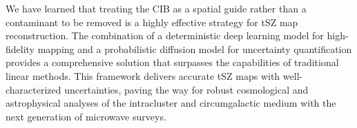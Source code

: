 \documentclass[]{article}
\begin{document}
We have learned that treating the CIB as a spatial guide rather than a contaminant to be removed is a highly effective strategy for tSZ map reconstruction. The combination of a deterministic deep learning model for high-fidelity mapping and a probabilistic diffusion model for uncertainty quantification provides a comprehensive solution that surpasses the capabilities of traditional linear methods. This framework delivers accurate tSZ maps with well-characterized uncertainties, paving the way for robust cosmological and astrophysical analyses of the intracluster and circumgalactic medium with the next generation of microwave surveys.
\end{document}
